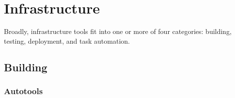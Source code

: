 \chapter{Infrastructure}\label{chap:infrastructure}




Broadly, infrastructure tools fit into one or more of four categories:
building, testing, deployment, and task automation.


\section{Building}\label{sec:building}


\cite{kelly2002optimization}


\subsection{Autotools}\label{subsec:autotools}



